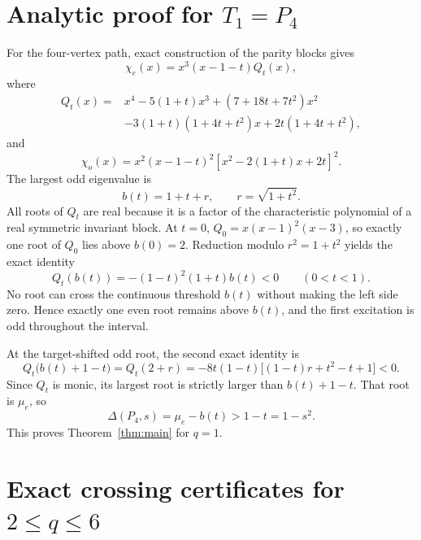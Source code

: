\documentclass[11pt]{article}
\begin{document}
\section{Analytic proof for \texorpdfstring{\(T_1=P_4\)}{T1 = P4}}
\label{sec:p4}

For the four-vertex path, exact construction of the parity blocks gives
\begin{equation}
 \chi_e(x)=x^3(x-1-t)Q_t(x),                            \label{eq:chie}
\end{equation}
where
\begin{align}
Q_t(x)={}&x^4-5(1+t)x^3+(7+18t+7t^2)x^2 \nonumber\\
 &-3(1+t)(1+4t+t^2)x+2t(1+4t+t^2),                    \label{eq:quartic}
\end{align}
and
\begin{equation}
 \chi_o(x)=x^2(x-1-t)^2
 \left[x^2-2(1+t)x+2t\right]^2.                       \label{eq:chio}
\end{equation}
The largest odd eigenvalue is
\begin{equation}
 b(t)=1+t+r,\qquad r=\sqrt{1+t^2}.                   \label{eq:b}
\end{equation}
All roots of \(Q_t\) are real because it is a factor of the
characteristic polynomial of a real symmetric invariant block.  At
\(t=0\), \(Q_0=x(x-1)^2(x-3)\), so exactly one root of \(Q_0\) lies
above \(b(0)=2\).  Reduction modulo \(r^2=1+t^2\) yields the exact identity
\begin{equation}
 Q_t(b(t))=-(1-t)^2(1+t)b(t)<0\qquad(0<t<1).           \label{eq:qb}
\end{equation}
No root can cross the continuous threshold \(b(t)\) without making the
left side zero.  Hence exactly one even root remains above \(b(t)\), and
the first excitation is odd throughout the interval.

At the target-shifted odd root, the second exact identity is
\begin{equation}
 Q_t\bigl(b(t)+1-t\bigr)=Q_t(2+r)
 =-8t(1-t)\bigl[(1-t)r+t^2-t+1\bigr]<0.               \label{eq:qshift}
\end{equation}
Since \(Q_t\) is monic, its largest root is strictly larger than
\(b(t)+1-t\).  That root is \(\mu_e\), so
\begin{equation}
       \Delta(P_4,s)=\mu_e-b(t)>1-t=1-s^2.            \label{eq:p4done}
\end{equation}
This proves Theorem~\ref{thm:main} for \(q=1\).

\section{Exact crossing certificates for
\texorpdfstring{\(2\leq q\leq6\)}{2 <= q <= 6}}
                                                                  \label{sec:cert}
\end{document}
